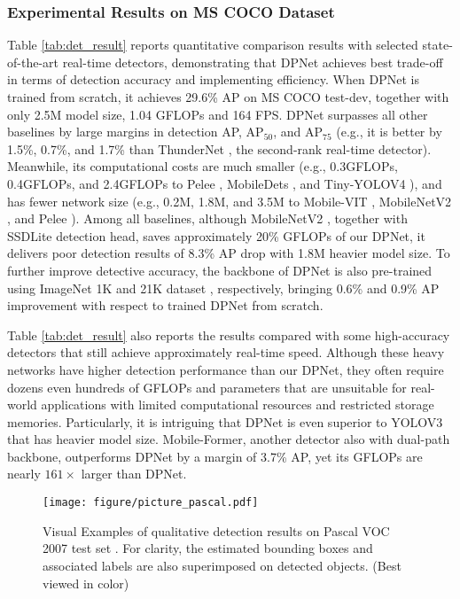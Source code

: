 \documentclass[lettersize,journal]{IEEEtran}
\begin{document}
\subsubsection{Experimental Results on MS COCO Dataset}
Table \ref{tab:det_result} reports quantitative comparison results with selected state-of-the-art real-time detectors, demonstrating that DPNet achieves best trade-off in terms of detection accuracy and implementing efficiency. When DPNet is trained from scratch, it achieves 29.6\% AP on MS COCO test-dev, together with only 2.5M model size, 1.04 GFLOPs and 164 FPS. DPNet surpasses all other baselines by large margins in detection AP, AP$_{50}$, and AP$_{75}$ (e.g., it is better by 1.5\%, 0.7\%, and 1.7\% than ThunderNet \cite{qin2019thundernet}, the second-rank real-time detector). Meanwhile, its computational costs are much smaller (e.g., 0.3GFLOPs, 0.4GFLOPs, and 2.4GFLOPs to Pelee \cite{Pelee}, MobileDets \cite{xiong2021mobiledets}, and Tiny-YOLOV4 \cite{wang2021scaled}), and has fewer network size (e.g., 0.2M, 1.8M, and 3.5M to Mobile-VIT \cite{mehta2021mobilevit}, MobileNetV2 \cite{sandler2018mobilenetv2}, and Pelee \cite{Pelee}). Among all baselines, although MobileNetV2 \cite{sandler2018mobilenetv2}, together with SSDLite detection head, saves approximately 20\% GFLOPs of our DPNet, it delivers poor detection results of 8.3\% AP drop with 1.8M heavier model size. To further improve detective accuracy, the backbone of DPNet is also pre-trained using ImageNet 1K and 21K dataset \cite{deng2009imagenet}, respectively, bringing 0.6\% and 0.9\% AP improvement with respect to trained DPNet from scratch.

Table \ref{tab:det_result} also reports the results compared with some high-accuracy detectors that still achieve approximately real-time speed. Although these heavy networks have higher detection performance than our DPNet, they often require dozens even hundreds of GFLOPs and parameters that are unsuitable for real-world applications with limited computational resources and restricted storage memories. Particularly, it is intriguing that DPNet is even superior to YOLOV3 \cite{redmon2018yolov3} that has heavier model size. Mobile-Former\cite{chen2021mobile}, another detector also with dual-path backbone, outperforms DPNet by a margin of 3.7\% AP, yet its GFLOPs are nearly $161\times$ larger than DPNet.

\begin{figure*}[t!] 
	\centering 
	\texttt{[image: figure/picture\_pascal.pdf]} 
	\caption{Visual Examples of qualitative  detection results on Pascal VOC 2007 test set \cite{everingham2010pascal}. For clarity, the estimated bounding boxes and associated labels are also superimposed on detected objects. (Best viewed in color)} 
	\label{Fig:Vis_pascal} 
\end{figure*}
\end{document}
